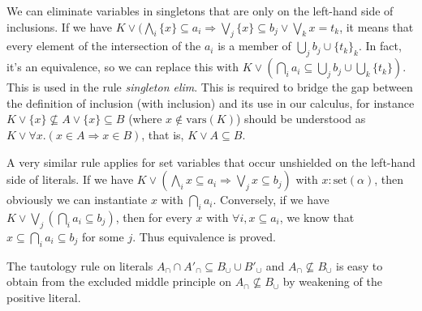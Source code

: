 \documentclass{article}
\newcommand{\set}[1]{\ensuremath{\text{set}({#1})}}
\begin{document}
We can eliminate variables in singletons that are only on the left-hand side
of inclusions. If we have $K \lor (\bigwedge_i \{ x \} \subseteq a_i
    \Rightarrow
        \bigvee_j \{ x \} \subseteq b_j
        \lor \bigvee_k x = t_k$,
it means that every element of the intersection of the $a_i$ is a member
of $\bigcup_j b_j \cup \{ t_k \}_k$. In fact, it's an equivalence, so
we can replace this
with $K\lor (\bigcap_i a_i \subseteq \bigcup_j b_j \cup \bigcup_k \{t_k\})$. This is
used in the rule \emph{singleton elim}. This is required to bridge the gap
between the definition of inclusion (with inclusion) and its use in our
calculus, for instance $K \lor \{x\} \not\subseteq A \lor \{x\} \subseteq B$
(where $x \not\in \text{vars}(K)$) should be understood as
$K \lor \forall x. (x \in A \Rightarrow x \in B)$,
that is, $K \lor A \subseteq B$.

A very similar rule applies for set variables that occur unshielded on the
left-hand side of literals. If we have $K \lor (\bigwedge_i x \subseteq a_i
\Rightarrow \bigvee_j x \subseteq b_j)$ with $x:\set{\alpha}$,
then obviously we can instantiate $x$ with $\bigcap_i a_i$. Conversely, if
we have $K \lor \bigvee_j (\bigcap_i a_i \subseteq b_j)$, then for
every $x$ with $\forall i, x \subseteq a_i$, we know that
$x \subseteq \bigcap_i a_i \subseteq b_j$ for some $j$. Thus equivalence is
proved.

The tautology rule on literals
$A_\cap \cap A'_\cap \subseteq B_\cup \cup B'_\cup$
and $A_\cap \not\subseteq B_\cup$
is easy to obtain from the excluded middle principle on
$A_\cap \not\subseteq B_\cup$ by weakening of the positive literal.
\end{document}
